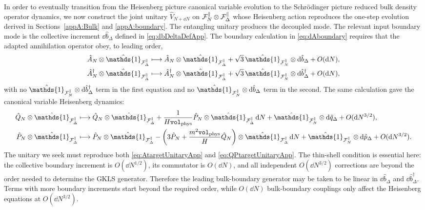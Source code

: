 \documentclass{article}
\def\cF{{\cal F}}
\newcommand{\openone}{\hat{\mathds{1}}}
\newcommand{\Vphys}{\mathtt{vol}_{\rm phys}}
\numberwithin{equation}{section}
\begin{document}
	In order to eventually transition from the Heisenberg picture canonical variable evolution to the Schr\"odinger picture reduced bulk density operator dynamics, we now construct the joint unitary \(\hat V_{N+\dd N}\) on \(\cF_N^\parallel\otimes\cF_\Delta^\parallel\) whose Heisenberg action reproduces the one-step evolution derived in Sections~\ref{appA:Bulk} and \ref{appA:boundary}. The entangling unitary produces the decoupled mode. The relevant input boundary mode is the collective increment \(\dd\hat b_\Delta\) defined in \cref{eq:dbDeltaDefApp}. The boundary calculation in \cref{eq:dAboundary} requires that the adapted annihilation operator obey, to leading order,
	\begin{align}
		\hat A_N\otimes\openone_{\cF_\Delta^\parallel} &\longmapsto \hat A_N\otimes\openone_{\cF_\Delta^\parallel} + \sqrt3\,\openone_{\cF_N^\parallel}\otimes \dd\hat b_\Delta + O(\dd N),\nonumber\\
		\hat A_N^\dagger\otimes\openone_{\cF_\Delta^\parallel} &\longmapsto \hat A_N^\dagger\otimes\openone_{\cF_\Delta^\parallel} + \sqrt3\,\openone_{\cF_N^\parallel}\otimes \dd\hat b_\Delta^\dagger + O(\dd N),
		\label{eq:AtargetUnitaryApp}
	\end{align}
	with no \(\openone_{\cF_N^\parallel}\otimes \dd\hat b_\Delta^\dagger\) term in the first equation and no \(\openone_{\cF_N^\parallel}\otimes \dd\hat b_\Delta\) term in the second. The same calculation gave the canonical variable Heisenberg dynamics:
	\begin{align}
		\hat Q_N\otimes\openone_{\cF_\Delta^\parallel} &\longmapsto \hat Q_N\otimes\openone_{\cF_\Delta^\parallel} + \frac{1}{H\Vphys}\hat P_N\otimes\openone_{\cF_\Delta^\parallel}\,\dd N + \openone_{\cF_N^\parallel}\otimes \dd\hat q_\Delta + O(\dd N^{3/2}), \nonumber\\ \hat P_N\otimes\openone_{\cF_\Delta^\parallel} &\longmapsto \hat P_N\otimes\openone_{\cF_\Delta^\parallel} - \left( 3\hat P_N + \frac{m^2\Vphys}{H}\hat Q_N \right)\otimes\openone_{\cF_\Delta^\parallel}\,\dd N + \openone_{\cF_N^\parallel}\otimes \dd\hat p_\Delta + O(\dd N^{3/2}).
		\label{eq:QPtargetUnitaryApp}
	\end{align}
	The unitary we seek must reproduce both \cref{eq:AtargetUnitaryApp} and \cref{eq:QPtargetUnitaryApp}. The thin-shell condition is essential here: the collective boundary increment is \(O(\dd N^{1/2})\), its commutator is \(O(\dd N)\), and all independent \(O(\dd N^{3/2})\) corrections are beyond the order needed to determine the GKLS generator. Therefore the leading bulk-boundary generator may be taken to be linear in \(\dd\hat b_\Delta\) and \(\dd\hat b_\Delta^\dagger\). Terms with more boundary increments start beyond the required order, while \(O(\dd N)\) bulk-boundary couplings only affect the Heisenberg equations at \(O(\dd N^{3/2})\).
\end{document}
